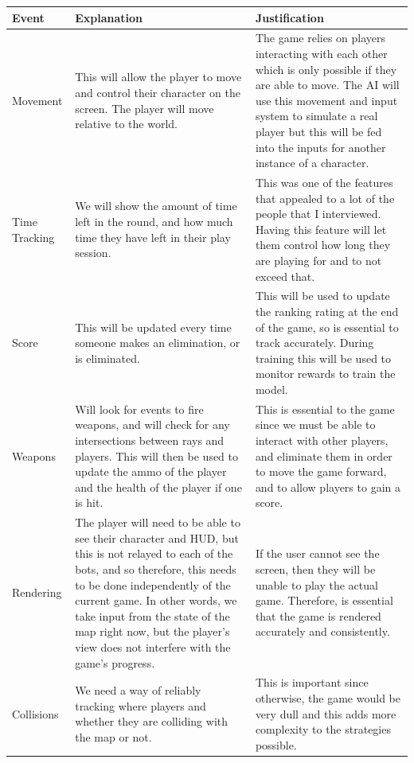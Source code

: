 \begin{longtable}{|p{3cm}|p{6cm}|p{6cm}|}
    \hline
    Event & Explanation & Justification\\
    \hline
    \hline
    Movement & This will allow the player to move and control their character on the screen. The player will move relative to the world. & The game relies on players interacting with each other which is only possible if they are able to move. The AI will use this movement and input system to simulate a real player but this will be fed into the inputs for another instance of a character.\\
    \hline
    Time Tracking & We will show the amount of time left in the round, and how much time they have left in their play session. & This was one of the features that appealed to a lot of the people that I interviewed. Having this feature will let them control how long they are playing for and to not exceed that.\\
    \hline
    Score & This will be updated every time someone makes an elimination, or is eliminated. & This will be used to update the ranking rating at the end of the game, so is essential to track accurately. During training this will be used to monitor rewards to train the model.\\
    \hline
    Weapons & Will look for events to fire weapons, and will check for any intersections between rays and players. This will then be used to update the ammo of the player and the health of the player if one is hit. & This is essential to the game since we must be able to interact with other players, and eliminate them in order to move the game forward, and to allow players to gain a score.\\
    \hline
    Rendering & The player will need to be able to see their character and HUD, but this is not relayed to each of the bots, and so therefore, this needs to be done independently of the current game. In other words, we take input from the state of the map right now, but the player's view does not interfere with the game's progress. & If the user cannot see the screen, then they will be unable to play the actual game. Therefore, is essential that the game is rendered accurately and consistently.\\
    \hline
    Collisions & We need a way of reliably tracking where players and whether they are colliding with the map or not. & This is important since otherwise, the game would be very dull and this adds more complexity to the strategies possible.\\
    \hline
\end{longtable}



